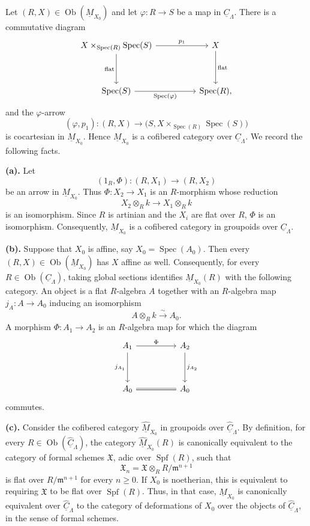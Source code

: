 Let $(R,X)\in\operatorname{Ob}(\underline M_{X_0})$ and let
$\varphi:R\longrightarrow S$ be a map in $\underline C_\Lambda$.
There is a commutative diagram
\[
\begin{tikzcd}[column sep=huge,row sep=huge]
X\times_{\operatorname{Spec}(R)}\operatorname{Spec}(S)
 \arrow[r,"p_1"] \arrow[d,"\mathrm{flat}"']
& X \arrow[d,"\mathrm{flat}"] \\
\operatorname{Spec}(S)
 \arrow[r,"\operatorname{Spec}(\varphi)"']
& \operatorname{Spec}(R),
\end{tikzcd}
\]
and the $\varphi$-arrow
\[
 (\varphi,p_1):(R,X)\longrightarrow
 \bigl(S,X\times_{\operatorname{Spec}(R)}\operatorname{Spec}(S)\bigr)
\]
is cocartesian in $\underline M_{X_0}$. Hence
$\underline M_{X_0}$ is a cofibered category over
$\underline C_\Lambda$. We record the following facts.


\medskip
\noindent\textbf{(a).}
Let
\[
 (1_R,\Phi):(R,X_1)\longrightarrow(R,X_2)
\]
be an arrow in $\underline M_{X_0}$. Thus
$\Phi:X_2\longrightarrow X_1$ is an $R$-morphism whose reduction
\[
 X_2\otimes_Rk\longrightarrow X_1\otimes_Rk
\]
is an isomorphism. Since $R$ is artinian and the $X_i$ are flat over
$R$, $\Phi$ is an isomorphism. Consequently,
$\underline M_{X_0}$ is a cofibered category in groupoids over
$\underline C_\Lambda$.

\medskip
\noindent\textbf{(b).}
Suppose that $X_0$ is affine, say
$X_0=\operatorname{Spec}(A_0)$. Then every
$(R,X)\in\operatorname{Ob}(\underline M_{X_0})$ has $X$ affine as
well. Consequently, for every
$R\in\operatorname{Ob}(\underline C_\Lambda)$, taking global
sections identifies $\underline M_{X_0}(R)$ with the following
category. An object is a flat $R$-algebra $A$ together with an
$R$-algebra map $j_A:A\longrightarrow A_0$ inducing an isomorphism
\[
 A\otimes_Rk\xrightarrow{\ \sim\ }A_0.
\]
A morphism $\Phi:A_1\longrightarrow A_2$ is an $R$-algebra map for
which the diagram
\[
\begin{tikzcd}[column sep=huge,row sep=huge]
A_1 \arrow[r,"\Phi"] \arrow[d,"j_{A_1}"']
& A_2 \arrow[d,"j_{A_2}"] \\
A_0 \arrow[r,equal] & A_0
\end{tikzcd}
\]
commutes.

\medskip
\noindent\textbf{(c).}
Consider the cofibered category $\widehat{\underline M}_{X_0}$ in
groupoids over $\widehat{\underline C}_\Lambda$. By definition, for
every $R\in\operatorname{Ob}(\widehat{\underline C}_\Lambda)$, the
category $\widehat{\underline M}_{X_0}(R)$ is canonically equivalent
to the category of formal schemes $\mathfrak X$, adic over
$\operatorname{Spf}(R)$, such that
\[
 \mathfrak X_n
 =\mathfrak X\otimes_R R/\mathfrak m^{n+1}
\]
is flat over $R/\mathfrak m^{n+1}$ for every $n\geq0$. If $X_0$ is
noetherian, this is equivalent to requiring $\mathfrak X$ to be flat
over $\operatorname{Spf}(R)$. Thus, in that case,
$\widehat{\underline M}_{X_0}$ is canonically equivalent over
$\widehat{\underline C}_\Lambda$ to the category of deformations of
$X_0$ over the objects of $\widehat{\underline C}_\Lambda$, in the
sense of formal schemes.

